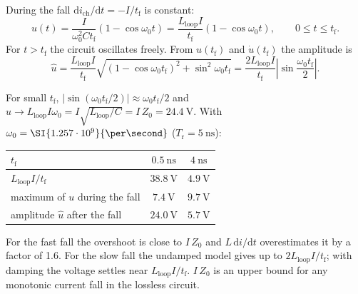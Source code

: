 
\begin{solutionblock}
	During the fall $\mathrm{d}i_\mathrm{ch}/\mathrm{d}t=-I/t_\mathrm{f}$ is constant:
	\begin{equation}
		u(t) = \frac{I}{\omega_0^2Ct_\mathrm{f}}\left(1-\cos\omega_0t\right) = \frac{L_\mathrm{loop}I}{t_\mathrm{f}}\left(1-\cos\omega_0t\right),\qquad 0\leq t\leq t_\mathrm{f}.
	\end{equation}
	For $t>t_\mathrm{f}$ the circuit oscillates freely. From $u(t_\mathrm{f})$ and $\dot{u}(t_\mathrm{f})$ the amplitude is
	\begin{equation}
		\hat{u} = \frac{L_\mathrm{loop}I}{t_\mathrm{f}}\sqrt{(1-\cos\omega_0t_\mathrm{f})^2+\sin^2\omega_0t_\mathrm{f}} = \frac{2L_\mathrm{loop}I}{t_\mathrm{f}}\left|\sin\frac{\omega_0t_\mathrm{f}}{2}\right|.
	\end{equation}
\end{solutionblock}


\begin{solutionblock}
	For small $t_\mathrm{f}$, $|\sin(\omega_0t_\mathrm{f}/2)|\approx\omega_0t_\mathrm{f}/2$ and $\hat{u}\rightarrow L_\mathrm{loop}I\omega_0=I\sqrt{L_\mathrm{loop}/C}=I\,Z_0=\SI{24.4}{\volt}$. With $\omega_0=\SI{1.257 \cdot 10^{9}}{\per\second}$ ($T_\mathrm{r}=\SI{5}{\nano\second}$):
	\begin{solutiontable}[ht]
		\centering
		\begin{tabular}{lcc}
			\toprule
			$t_\mathrm{f}$                                & $\SI{0.5}{\nano\second}$ & $\SI{4}{\nano\second}$ \\
			\midrule
			$L_\mathrm{loop}I/t_\mathrm{f}$               & $\SI{38.8}{\volt}$       & $\SI{4.9}{\volt}$      \\
			maximum of $u$ during the fall                & $\SI{7.4}{\volt}$        & $\SI{9.7}{\volt}$      \\
			amplitude $\hat{u}$ after the fall            & $\SI{24.0}{\volt}$       & $\SI{5.7}{\volt}$      \\
			\bottomrule
		\end{tabular}
		\caption{Turn-off overshoot without damping, $I\,Z_0=\SI{24.4}{\volt}$.}
		\label{stable:ex03_turnoff}
	\end{solutiontable}
	For the fast fall the overshoot is close to $I\,Z_0$ and $L\,\mathrm{d}i/\mathrm{d}t$ overestimates it by a factor of 1.6. For the slow fall the undamped model gives up to $2L_\mathrm{loop}I/t_\mathrm{f}$; with damping the voltage settles near $L_\mathrm{loop}I/t_\mathrm{f}$. $I\,Z_0$ is an upper bound for any monotonic current fall in the lossless circuit.
\end{solutionblock}

